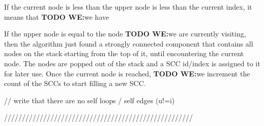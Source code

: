 \documentclass{l4proj}
\begin{document}
\noindent If the current node is less than the upper node is less than the current index, it means that \textbf{TODO WE:}we have 

\noindent If the upper node is equal to the node \textbf{TODO WE:}we are currently visiting, then the algorithm just found a strongly connected component that contains all nodes on the stack starting from the top of it, until encountering the current node. The nodes are popped out of the stack and a SCC id/index is assigned to it for later use. Once the current node is reached, \textbf{TODO WE:}we increment the count of the SCCs to start filling a new SCC.

\noindent // write that there are no self loops / self edges (u!=i)

 /////////////////////////////////////////////////////
\fi

\newpage
\end{document}
